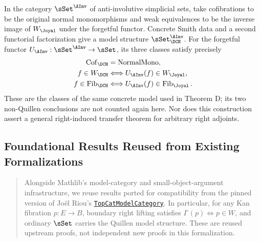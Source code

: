 \begin{resultblock}
\begin{theorem}
In the category $\sSet^{\AInv}$ of anti-involutive simplicial sets, take cofibrations to be the original normal monomorphisms and weak equivalences to be the inverse image of $W_{\Joyal}$ under the forgetful functor.
Concrete Smith data and a second functorial factorization give a model structure $\sSet^{\AInv}_{\DCH}$.
For the forgetful functor $U_{\AInv}:\sSet^{\AInv}\to\sSet$, its three classes satisfy precisely
\begin{align}
\Cof_{\DCH} &= \operatorname{NormalMono}, \\
f\in W_{\DCH}
  &\Longleftrightarrow U_{\AInv}(f)\in W_{\Joyal}, \\
f\in\Fib_{\DCH}
  &\Longleftrightarrow U_{\AInv}(f)\in\Fib_{\Joyal}.
\end{align}
These are the classes of the same concrete model used in Theorem D; its two non-Quillen conclusions are not counted again here.
Nor does this construction assert a general right-induced transfer theorem for arbitrary right adjoints.
\end{theorem}
\end{resultblock}

\subsection{Foundational Results Reused from Existing Formalizations}

\begin{quote}
\raggedright
Alongside Mathlib's model-category and small-object-argument infrastructure, we reuse results ported for compatibility from the pinned version of Jo\"el Riou's
\href{https://github.com/joelriou/topcat-model-category/tree/6c0c356fea469689fe76baeb47ba773460dfacee}{\texttt{TopCatModelCategory}}.
In particular, for any Kan fibration $p:E\to B$, boundary right lifting satisfies $I^{\square}(p)\Leftrightarrow p\in W$, and ordinary $\sSet$ carries the Quillen model structure.
These are reused upstream proofs, not independent new proofs in this formalization.
\end{quote}

